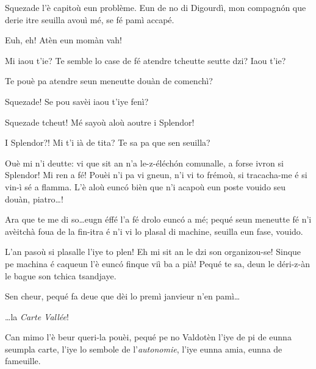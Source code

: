 \begin{drama}

\Pierrespeaks Squezade l'è capitoù eun problème. Eun de no di Digourdì, mon compagn\'on que derie itre seuilla avouì mé, se fé pamì accapé.


\Laurentspeaks Euh, eh! Atèn eun momàn vah!


\Pierrespeaks Mi iaou t'ie? Te semble lo case de fé atendre tcheutte seutte dzi? Iaou t'ie?

\Laurentspeaks {} Te pouè pa atendre seun meneutte douàn de comenchì?

\Pierrespeaks {} Squezade!  Se pou savèi iaou t'iye fenì?

\Laurentspeaks Squezade tcheut! Mé sayoù aloù aoutre i Splendor! 

\Pierrespeaks I Splendor?! Mi t'i ià de tita? Te sa pa que sen seuilla?

\Laurentspeaks Ouè mi n'i deutte: vi que sit an n'a le-z-éléch\'on comunalle, a forse ivron si Splendor! Mi ren a fé! Pouèi n'i pa vi gneun, n'i vi to frémoù, si tracacha-me é si vin-ì sé a flamma. L'è aloù eunc\'o bièn que n'i acapoù eun poste vouido seu douàn, piatro\ldots !

\Pierrespeaks Ara que te me di so\ldots eugn éffé l'a fé drolo eunc\'o a mé; pequé seun meneutte fé n'i avèitchà foua de la fin-itra é n'i vi lo plasal di machine, seuilla eun fase, vouido.

\Laurentspeaks L'an pasoù si plasalle l'iye to plen! Eh mi sit an le dzi son organizou-se! Sinque pe machina é caqueun l'è eunc\'o finque viì ba a pià! Pequé te sa, deun le déri-z-àn le bague son tchica tsandjaye.

\Pierrespeaks Sen cheur, pequé fa deue que dèi lo premì janvieur n'en pamì\ldots


\Laurentspeaks \ldots la \textit{Carte Vallée}!

\Pierrespeaks Can mimo l'è beur queri-la pouèi, pequé pe no Valdotèn l'iye de pi de eunna seumpla carte, l'iye lo sembole de l'\textit{au\-to\-no\-mie}, l'iye eunna amia, eunna de fameuille.


\end{drama}
